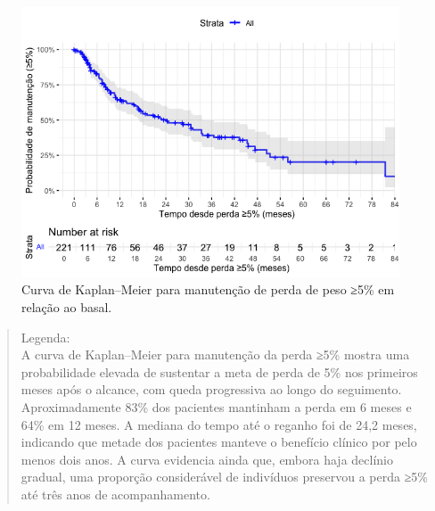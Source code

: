 \documentclass[
]{article}
\newenvironment{Shaded}{\begin{snugshade}}{\end{snugshade}}
\newcommand{\AttributeTok}[1]{\textcolor[rgb]{0.40,0.45,0.13}{#1}}
\newcommand{\CommentTok}[1]{\textcolor[rgb]{0.37,0.37,0.37}{#1}}
\newcommand{\ConstantTok}[1]{\textcolor[rgb]{0.56,0.35,0.01}{#1}}
\newcommand{\FunctionTok}[1]{\textcolor[rgb]{0.28,0.35,0.67}{#1}}
\newcommand{\NormalTok}[1]{\textcolor[rgb]{0.00,0.23,0.31}{#1}}
\newcommand{\OtherTok}[1]{\textcolor[rgb]{0.00,0.23,0.31}{#1}}
\newcommand{\SpecialCharTok}[1]{\textcolor[rgb]{0.37,0.37,0.37}{#1}}
\begin{document}
\begin{figure}[H]

{\centering \includegraphics[width=1\textwidth,height=\textheight]{outputs/figs/km-manutencao-5-1.png}

}

\caption{Curva de Kaplan--Meier para manutenção de perda de peso ≥5\% em
relação ao basal.}

\end{figure}%

\begin{quote}
Legenda:\\
A curva de Kaplan--Meier para manutenção da perda ≥5\% mostra uma
probabilidade elevada de sustentar a meta de perda de 5\% nos primeiros
meses após o alcance, com queda progressiva ao longo do seguimento.
Aproximadamente 83\% dos pacientes mantinham a perda em 6 meses e 64\%
em 12 meses. A mediana do tempo até o reganho foi de 24,2 meses,
indicando que metade dos pacientes manteve o benefício clínico por pelo
menos dois anos. A curva evidencia ainda que, embora haja declínio
gradual, uma proporção considerável de indivíduos preservou a perda ≥5\%
até três anos de acompanhamento.\\
\end{quote}

\begin{Shaded}
\end{Shaded}
\end{document}
